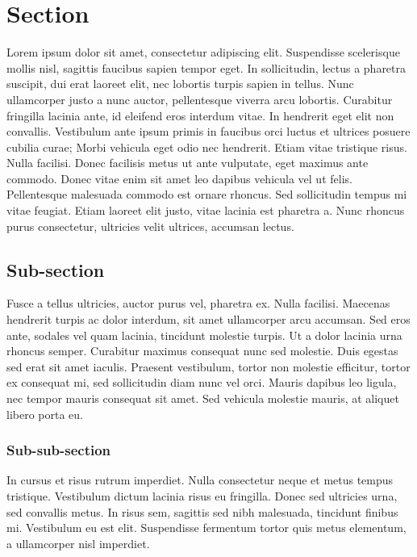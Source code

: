 \documentclass[12pt]{article}
\begin{document}
\renewcommand{\baselinestretch}{1.15}

\setmainfont{Liberation Serif}

\section{Section}

Lorem ipsum dolor sit amet, consectetur adipiscing elit. Suspendisse scelerisque mollis nisl, sagittis faucibus sapien tempor eget. In sollicitudin, lectus a pharetra suscipit, dui erat laoreet elit, nec lobortis turpis sapien in tellus. Nunc ullamcorper justo a nunc auctor, pellentesque viverra arcu lobortis. Curabitur fringilla lacinia ante, id eleifend eros interdum vitae. In hendrerit eget elit non convallis. Vestibulum ante ipsum primis in faucibus orci luctus et ultrices posuere cubilia curae; Morbi vehicula eget odio nec hendrerit. Etiam vitae tristique risus. Nulla facilisi. Donec facilisis metus ut ante vulputate, eget maximus ante commodo. Donec vitae enim sit amet leo dapibus vehicula vel ut felis. Pellentesque malesuada commodo est ornare rhoncus. Sed sollicitudin tempus mi vitae feugiat. Etiam laoreet elit justo, vitae lacinia est pharetra a. Nunc rhoncus purus consectetur, ultricies velit ultrices, accumsan lectus. 

\subsection{Sub-section}

Fusce a tellus ultricies, auctor purus vel, pharetra ex. Nulla facilisi. Maecenas hendrerit turpis ac dolor interdum, sit amet ullamcorper arcu accumsan. Sed eros ante, sodales vel quam lacinia, tincidunt molestie turpis. Ut a dolor lacinia urna rhoncus semper. Curabitur maximus consequat nunc sed molestie. Duis egestas sed erat sit amet iaculis. Praesent vestibulum, tortor non molestie efficitur, tortor ex consequat mi, sed sollicitudin diam nunc vel orci. Mauris dapibus leo ligula, nec tempor mauris consequat sit amet. Sed vehicula molestie mauris, at aliquet libero porta eu. 

\subsubsection{Sub-sub-section}

In cursus et risus rutrum imperdiet. Nulla consectetur neque et metus tempus tristique. Vestibulum dictum lacinia risus eu fringilla. Donec sed ultricies urna, sed convallis metus. In risus sem, sagittis sed nibh malesuada, tincidunt finibus mi. Vestibulum eu est elit. Suspendisse fermentum tortor quis metus elementum, a ullamcorper nisl imperdiet.
\end{document}
